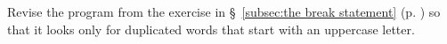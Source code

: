 %
%
\begin{question}
Revise the program from the exercise in \S~\ref{subsec:the break statement} (p. \pageref{subsec:the break statement}) so
that it looks only for duplicated words that start with an uppercase letter.
\end{question}
